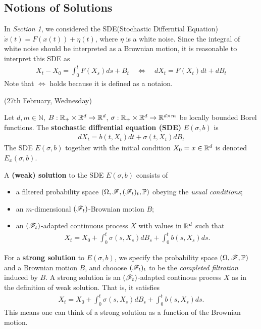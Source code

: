 \documentclass[12pt,a4paper]{article}
\renewenvironment{i}
{\begin{itemize} 
	}%
	{\end{itemize}
}
\begin{document}
\subsection{Notions of Solutions}

In \emph{Section 1}, we considered the SDE(Stochastic Differntial Equation) $\dot{x}(t) =F(x(t)) + \eta(t)$, where $\eta$ is a white noise. Since the integral of white noise should be interpreted as a Brownian motion, it is reasonable to interpret this SDE as
\begin{align*}
X_t - X_0 = \int_0^t F(X_s) ds + B_t \quad \Leftrightarrow \quad dX_t = F(X_t) dt + dB_t 
\end{align*}
Note that $\Leftrightarrow$ holds because it is defined as a notaion.
\s

\newday

(27th February, Wednesday)
\s

 Let $d, m\in \mathbb{N}$, $B: \mathbb{R}_+ \times \mathbb{R}^d \rightarrow \mathbb{R}^d$, $\sigma : \mathbb{R}_+ \times \mathbb{R}^d \rightarrow \mathbb{R}^{d\times m}$ be locally bounded Borel functions. The \textbf{stochastic diffrential equation (SDE)} $E(\sigma, b)$ is
\begin{align*}
dX_t = b(t, X_t) dt + \sigma(t, X_t) dB_t
\end{align*}
The SDE $E(\sigma, b)$ together with the initial condition $X_0 = x\in \mathbb{R}^d$ is denoted $E_x(\sigma, b)$.
\s

 A \textbf{(weak) solution} to the SDE $E(\sigma, b)$ consists of
\begin{i}
\item a filtered probability space $(\Omega, \mathscr{F}, (\mathscr{F}_t)_{t}, \mathbb{P})$ obeying the \emph{usual conditions};
\item an $m$-dimensional $(\mathscr{F}_t)$-Brownian motion $B$;
\item an $(\mathscr{F}_t)$-adapted continuous process $X$ with values in $\mathbb{R}^d$ such that
\begin{align*}
X_t = X_0 + \int_0^t \sigma(s, X_s) dB_s + \int_0^t b(s, X_s) ds.
\end{align*} 
\end{i}
\s

 For a \textbf{strong solution} to $E(\sigma, b)$, we specify the probability space $(\Omega, \mathscr{F}, \mathbb{P})$ and a Brownian motion $B$, and chooose $(\mathscr{F}_t)_t$ to be the \emph{completed filtration} induced by $B$. A strong solution is an $(\mathscr{F}_t)$-adapted continous process $X$ as in the definition of weak solution. That is, it satisfies
\begin{align*}
X_t = X_0 + \int_0^t \sigma(s, X_s) dB_s + \int_0^t b(s, X_s) ds.
\end{align*} 
This means one can think of a strong solution as a function of the Brownian motion.
\s
\end{document}

